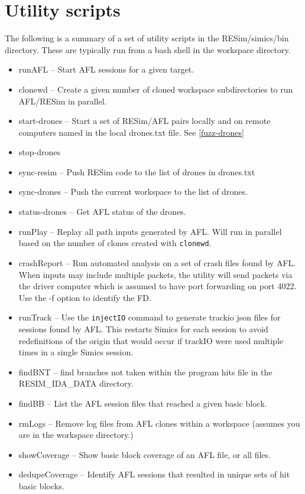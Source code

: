 \documentclass[titlepage]{article}
\begin{document}
\section{Utility scripts}
\label{utilities}
The following is a summary of a set of utility scripts in the RESim/simics/bin directory.
These are typically run from a bash shell in the workspace directory.
\begin{itemize}
\item runAFL -- Start AFL sessions for a given target.
\item clonewd -- Create a given number of cloned workspace subdirectories to run AFL/RESim in parallel.
\item start-drones -- Start a set of RESim/AFL pairs locally and on remote computers named in the local drones.txt file. See \ref{fuzz-drones}
\item stop-drones
\item sync-resim -- Push RESim code to the list of drones in drones.txt
\item sync-drones -- Push the current workspace to the list of drones.
\item status-drones -- Get AFL status of the drones.
\item runPlay -- Replay all path inputs generated by AFL.  Will run in parallel based on the number of clones created with {\tt clonewd}.
\item crashReport -- Run automated analysis on a set of crash files found by AFL.  When inputs may include multiple packets, the utility
will send packets via the driver computer which is assumed to have port forwarding on port 4022.   Use the -f option
to identify the FD.
\item runTrack -- Use the {\tt injectIO} command to generate trackio json files for sessions found by AFL. This restarts Simics for each session
to avoid redefinitions of the origin that would occur if trackIO were used multiple times in a single Simics session.
\item findBNT -- find branches not taken within the program hits file in the RESIM\_IDA\_DATA directory.
\item findBB -- List the AFL session files that reached a given basic block.
\item rmLogs -- Remove log files from AFL clones within a workspace (assumes you are in the workspace directory.)
\item showCoverage -- Show basic block coverage of an AFL file, or all files.
\item dedupeCoverage -- Identify AFL sessions that resulted in unique sets of hit basic blocks.

\end{itemize}
\end{document}
